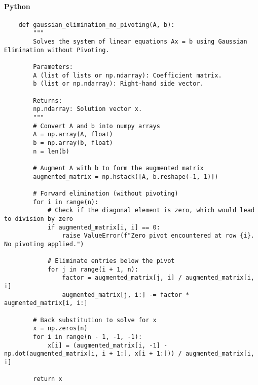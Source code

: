 \documentclass{article}
\begin{document}
            \paragraph{Python}
                \begin{verbatim}
    def gaussian_elimination_no_pivoting(A, b):
        """
        Solves the system of linear equations Ax = b using Gaussian Elimination without Pivoting.

        Parameters:
        A (list of lists or np.ndarray): Coefficient matrix.
        b (list or np.ndarray): Right-hand side vector.

        Returns:
        np.ndarray: Solution vector x.
        """
        # Convert A and b into numpy arrays
        A = np.array(A, float)
        b = np.array(b, float)
        n = len(b)

        # Augment A with b to form the augmented matrix
        augmented_matrix = np.hstack([A, b.reshape(-1, 1)])

        # Forward elimination (without pivoting)
        for i in range(n):
            # Check if the diagonal element is zero, which would lead to division by zero
            if augmented_matrix[i, i] == 0:
                raise ValueError(f"Zero pivot encountered at row {i}. No pivoting applied.")

            # Eliminate entries below the pivot
            for j in range(i + 1, n):
                factor = augmented_matrix[j, i] / augmented_matrix[i, i]
                augmented_matrix[j, i:] -= factor * augmented_matrix[i, i:]

        # Back substitution to solve for x
        x = np.zeros(n)
        for i in range(n - 1, -1, -1):
            x[i] = (augmented_matrix[i, -1] - np.dot(augmented_matrix[i, i + 1:], x[i + 1:])) / augmented_matrix[i, i]

        return x
                \end{verbatim}
\end{document}
